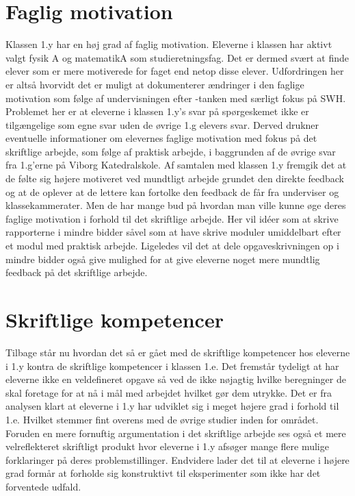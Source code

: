 \section{Faglig motivation}
\label{sec:faglig}
Klassen 1.y har en høj grad af faglig motivation. Eleverne i klassen har aktivt valgt fysik A og matematikA  som studieretningsfag. Det er dermed svært at finde elever som er mere motiverede for faget end netop disse elever. Udfordringen her er altså hvorvidt det er muligt at dokumenterer ændringer i den faglige motivation som følge af undervisningen efter \ib-tanken med særligt fokus på SWH. Problemet her er at eleverne i klassen 1.y's svar på spørgeskemet ikke er tilgængelige som egne svar uden de øvrige 1.g elevers svar. Derved drukner eventuelle informationer om elevernes faglige motivation med fokus på det skriftlige arbejde, som følge af praktisk arbejde, i baggrunden af de øvrige svar fra 1.g'erne på Viborg Katedralskole.
Af samtalen med klassen 1.y fremgik det at de følte sig højere motiveret ved mundtligt arbejde grundet den direkte feedback og at de oplever at de lettere kan fortolke den feedback de får fra underviser og klassekammerater. Men de har mange bud på hvordan man ville kunne øge deres faglige motivation i forhold til det skriftlige arbejde. Her vil idéer som at skrive rapporterne i mindre bidder såvel som at have skrive moduler umiddelbart efter et modul med praktisk arbejde. Ligeledes vil det at dele opgaveskrivningen op i mindre bidder også give mulighed for at give eleverne noget mere mundtlig feedback på det skriftlige arbejde. 

\section{Skriftlige kompetencer}
\label{sec:skr}
Tilbage står nu hvordan det så er gået med de skriftlige kompetencer hos eleverne i 1.y kontra de skriftlige kompetencer i klassen 1.e. Det fremstår tydeligt at har eleverne ikke en veldefineret opgave så ved de ikke nøjagtig hvilke beregninger de skal foretage for at nå i mål med arbejdet hvilket gør dem utrykke.
 Det er fra analysen klart at eleverne i 1.y har udviklet sig i meget højere grad i forhold til 1.e. Hvilket stemmer fint overens med de øvrige studier inden for området. Foruden en mere fornuftig argumentation i det skriftlige arbejde ses også et mere velreflekteret skriftligt produkt hvor eleverne i 1.y afsøger mange flere mulige forklaringer på deres problemstillinger. Endvidere lader det til at eleverne i højere grad formår at forholde sig konstruktivt til eksperimenter som ikke har det forventede udfald. 